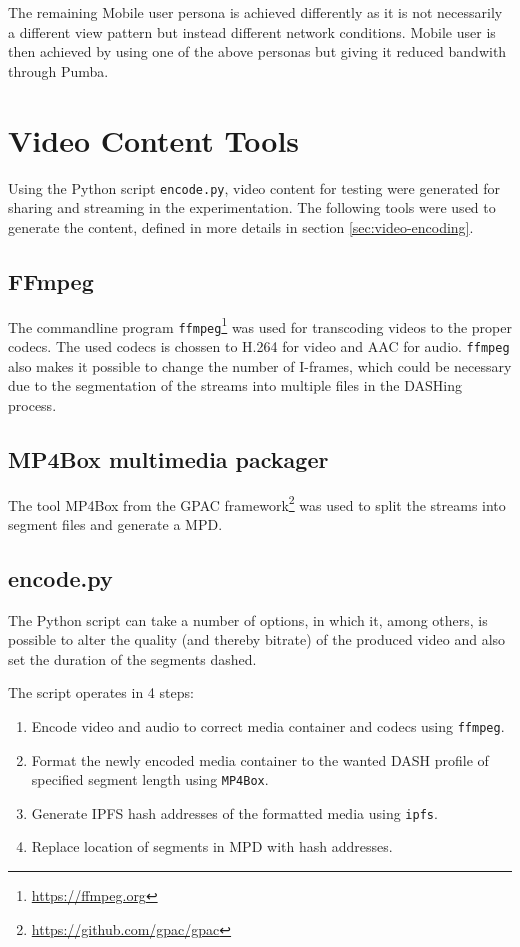 The remaining Mobile user persona is achieved differently as it is not necessarily a different view pattern but instead different network conditions. Mobile user is then achieved by using one of the above personas but giving it reduced bandwith through Pumba.

\section{Video Content Tools}
Using the Python script \texttt{encode.py}, video content for testing were generated for sharing and streaming in the experimentation. The following tools were used to generate the content, defined in more details in section \ref{sec:video-encoding}.

\subsection{FFmpeg}
The commandline program \texttt{ffmpeg}\footnote{\url{https://ffmpeg.org}} was used for transcoding videos to the proper codecs. The used codecs is chossen to H.264 for video and AAC for audio. 
\texttt{ffmpeg} also makes it possible to change the number of I-frames, which could be necessary due to the segmentation of the streams into multiple files in the DASHing process.

\subsection{MP4Box multimedia packager}
The tool MP4Box from the GPAC framework\footnote{\url{https://github.com/gpac/gpac}} was used to split the streams into segment files and generate a \acs{MPD}.

\subsection{encode.py}
The Python script can take a number of options, in which it, among others, is possible to alter the quality (and thereby bitrate) of the produced video and also set the duration of the segments dashed.

The script operates in 4 steps:
\begin{enumerate}
    \item Encode video and audio to correct media container and codecs using \texttt{ffmpeg}.
    \item Format the newly encoded media container to the wanted DASH profile of specified segment length using \texttt{MP4Box}.
    \item Generate \acs{IPFS} hash addresses of the formatted media using \texttt{ipfs}.
    \item Replace location of segments in \acs{MPD} with hash addresses.
\end{enumerate}

